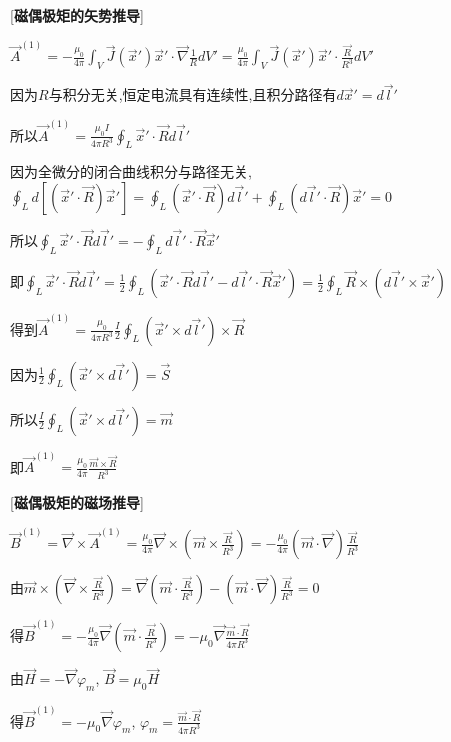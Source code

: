 [\textbf{磁偶极矩的矢势推导}]\par
\qquad $\vec A^{(1)}=-\frac{\mu_0}{4\pi}\int_V\vec J(\vec x')\vec x'\cdot\vec\nabla\frac{1}{R}dV'=\frac{\mu_0}{4\pi}\int_V\vec J(\vec x')\vec x'\cdot\frac{\vec R}{R^3}dV'$\par
\qquad 因为$R$与积分无关,恒定电流具有连续性,且积分路径有$d\vec x'=d\vec l'$\par
\qquad \quad 所以$\vec A^{(1)}=\frac{\mu_0I}{4\pi R^3}\oint_L\vec x'\cdot\vec R d\vec l'$\par
\qquad 因为全微分的闭合曲线积分与路径无关, $\oint_Ld[(\vec x'\cdot\vec R)\vec x']=\oint_L(\vec x'\cdot\vec R)d\vec l'+\oint_L(d\vec l'\cdot\vec R)\vec x'=0$\par
\qquad \quad 所以$\oint_L\vec x'\cdot\vec Rd\vec l'=-\oint_Ld\vec l'\cdot\vec R\vec x'$\par
\qquad \quad 即$\oint_L\vec x'\cdot\vec Rd\vec l'=\frac{1}{2}\oint_L\left(\vec x'\cdot\vec Rd\vec l'-d\vec l'\cdot\vec R\vec x'\right)=\frac{1}{2}\oint_L\vec R\times(d\vec l'\times\vec x')$\par
\qquad 得到$\vec A^{(1)}=\frac{\mu_0}{4\pi R^3}\frac{I}{2}\oint_L(\vec x'\times d\vec l')\times\vec R$\par
\qquad 因为$\frac{1}{2}\oint_L(\vec x'\times d\vec l')=\vec S$\par
\qquad \quad 所以$\frac{I}{2}\oint_L(\vec x'\times d\vec l')=\vec m$\par
\qquad \quad 即$\vec A^{(1)}=\frac{\mu_0}{4\pi}\frac{\vec m\times\vec R}{R^3}$\par

[\textbf{磁偶极矩的磁场推导}]\par
\qquad $\vec B^{(1)}=\vec\nabla\times\vec A^{(1)}=\frac{\mu_0}{4\pi}\vec\nabla\times(\vec m\times\frac{\vec R}{R^3})=-\frac{\mu_0}{4\pi}(\vec m\cdot\vec\nabla)\frac{\vec R}{R^3}$\par
\qquad 由$\vec m\times(\vec\nabla\times\frac{\vec R}{R^3})=\vec\nabla(\vec m\cdot\frac{\vec R}{R^3})-(\vec m\cdot\vec\nabla)\frac{\vec R}{R^3}=0$\par
\qquad \quad 得$\vec B^{(1)}=-\frac{\mu_0}{4\pi}\vec\nabla(\vec m\cdot\frac{\vec R}{R^3})=-\mu_0\vec\nabla\frac{\vec m\cdot\vec R}{4\pi R^3}$\par
\qquad 由$\vec H=-\vec\nabla\varphi_m$, $\vec B=\mu_0\vec H$\par
\qquad \quad 得$\vec B^{(1)}=-\mu_0\vec\nabla\varphi_m$, $\varphi_m=\frac{\vec m\cdot\vec R}{4\pi R^3}$\par

